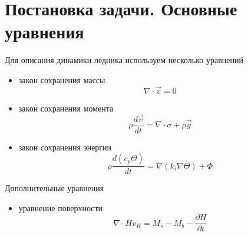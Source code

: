 \section*{Постановка задачи. Основные уравнения}

Для описания динамики ледника используем несколько уравнений
\begin{itemize}
    \item закон сохранения массы
        \begin{equation*}
        \nabla
        \cdot
        \vec{v}
        =
        0
        \end{equation*}
    \item закон сохранения момента
        \begin{equation*}
            \rho
            \frac
                {d \vec{v}}
                {dt}
            =
            \nabla
            \cdot
            \sigma
            +
            \rho
            \vec{g}
        \end{equation*}
    \item закон сохранения энергии
        \begin{equation*}
            \rho
            \frac
                {d \left( c_{p}\Theta \right)}
                {dt}
            =
            \nabla
            \left(
                k_{i}
                \nabla
                \Theta
            \right)
            +
            \Phi
        \end{equation*}
\end{itemize}

Дополнительные уравнения
\begin{itemize}
    \item уравнение поверхности
    \begin{equation*}
        \nabla
        \cdot
        H
        \overline{v_{H}}
        =
        \dot{M}_s
        -
        \dot{M}_b
        -
        \frac
            {\partial H}
            {\partial t}
    \end{equation*}
\end{itemize}

